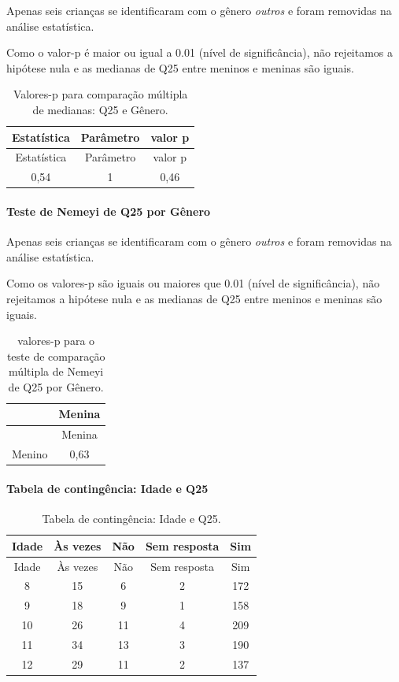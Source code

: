 \documentclass[]{article}
\let\oldparagraph\paragraph
\renewcommand{\paragraph}[1]{\oldparagraph{#1}\mbox{}}
\begin{document}
Apenas seis crianças se identificaram com o gênero \emph{outros} e foram removidas na análise estatística.

Como o valor-p é maior ou igual a 0.01 (nível de significância), não rejeitamos a hipótese nula e as medianas de Q25 entre meninos e meninas são iguais.

\begin{longtable}[]{@{}ccc@{}}
\caption{\label{tab:unnamed-chunk-678}Valores-p para comparação múltipla de medianas: Q25 e Gênero.}\tabularnewline
\toprule
Estatística & Parâmetro & valor p\tabularnewline
\midrule
\endfirsthead
\toprule
Estatística & Parâmetro & valor p\tabularnewline
\midrule
\endhead
0,54 & 1 & 0,46\tabularnewline
\bottomrule
\end{longtable}

\hypertarget{teste-de-nemeyi-de-q25-por-guxeanero}{%
\paragraph{Teste de Nemeyi de Q25 por Gênero}\label{teste-de-nemeyi-de-q25-por-guxeanero}}

Apenas seis crianças se identificaram com o gênero \emph{outros} e foram removidas na análise estatística.

Como os valores-p são iguais ou maiores que 0.01 (nível de significância), não rejeitamos a hipótese nula e as medianas de Q25 entre meninos e meninas são iguais.

\begin{longtable}[]{@{}lc@{}}
\caption{\label{tab:unnamed-chunk-680}valores-p para o teste de comparação múltipla de Nemeyi de Q25 por Gênero.}\tabularnewline
\toprule
& Menina\tabularnewline
\midrule
\endfirsthead
\toprule
& Menina\tabularnewline
\midrule
\endhead
Menino & 0,63\tabularnewline
\bottomrule
\end{longtable}

\cleardoublepage

\hypertarget{tabela-de-continguxeancia-idade-e-q25}{%
\paragraph{Tabela de contingência: Idade e Q25}\label{tabela-de-continguxeancia-idade-e-q25}}

\begin{longtable}[]{@{}ccccc@{}}
\caption{\label{tab:unnamed-chunk-681}Tabela de contingência: Idade e Q25.}\tabularnewline
\toprule
Idade & Às vezes & Não & Sem resposta & Sim\tabularnewline
\midrule
\endfirsthead
\toprule
Idade & Às vezes & Não & Sem resposta & Sim\tabularnewline
\midrule
\endhead
8 & 15 & 6 & 2 & 172\tabularnewline
9 & 18 & 9 & 1 & 158\tabularnewline
10 & 26 & 11 & 4 & 209\tabularnewline
11 & 34 & 13 & 3 & 190\tabularnewline
12 & 29 & 11 & 2 & 137\tabularnewline
\bottomrule
\end{longtable}
\end{document}
